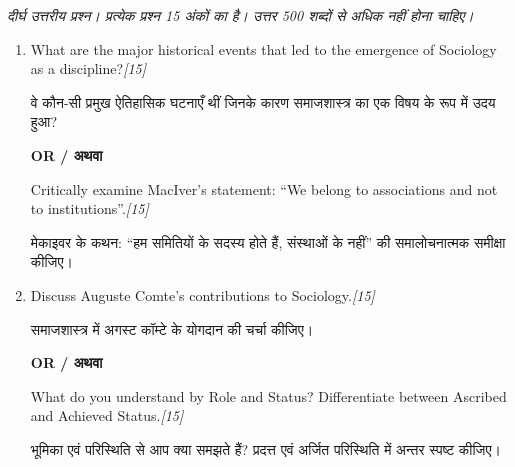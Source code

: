 \documentclass[11pt,a4paper]{article}
\newcommand{\pts}[1]{\hfill \textit{[#1]}}
\begin{document}
\noindent \textit{दीर्घ उत्तरीय प्रश्न। प्रत्येक प्रश्न 15 अंकों का है। उत्तर 500 शब्दों से अधिक नहीं होना चाहिए।}

\begin{enumerate}[label=\textbf{\arabic*.},leftmargin=*,start=5,itemsep=14pt]

  \item What are the major historical events that led to the emergence of Sociology as a discipline?\pts{15}
  
  वे कौन-सी प्रमुख ऐतिहासिक घटनाएँ थीं जिनके कारण समाजशास्त्र का एक विषय के रूप में उदय हुआ?

  \begin{center}\textbf{OR / अथवा}\end{center}

  Critically examine MacIver's statement: ``We belong to associations and not to institutions''.\pts{15}
  
  मेकाइवर के कथन: ``हम समितियों के सदस्य होते हैं, संस्थाओं के नहीं'' की समालोचनात्मक समीक्षा कीजिए।

  \item Discuss Auguste Comte's contributions to Sociology.\pts{15}
  
  समाजशास्त्र में अगस्ट कॉम्टे के योगदान की चर्चा कीजिए।

  \begin{center}\textbf{OR / अथवा}\end{center}

  What do you understand by Role and Status? Differentiate between Ascribed and Achieved Status.\pts{15}
  
  भूमिका एवं परिस्थिति से आप क्या समझते हैं? प्रदत्त एवं अर्जित परिस्थिति में अन्तर स्पष्ट कीजिए।

\end{enumerate}
\end{document}
